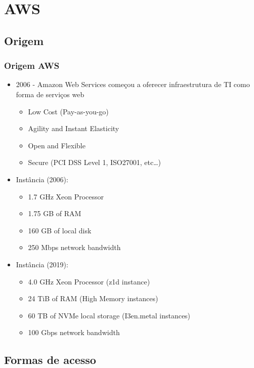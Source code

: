 \section{AWS}

\subsection{Origem}

\begin{frame}[allowframebreaks]
	\frametitle{Origem AWS}
	\begin{itemize}
		\item 2006 - Amazon Web Services começou a oferecer infraestrutura de TI como forma de serviços web
			\begin{itemize}
				\item Low Cost (Pay-as-you-go)
				\item Agility and Instant Elasticity
				\item Open and Flexible
				\item Secure (PCI DSS Level 1, ISO27001, etc\dots)
			\end{itemize}
		\item Instância (2006):
			\begin{itemize}
				\item 1.7 GHz Xeon Processor
				\item 1.75 GB of RAM
				\item 160 GB of local disk
				\item 250 Mbps network bandwidth
			\end{itemize}
		\item Instância (2019):
			\begin{itemize}
				\item 4.0 GHz Xeon Processor (z1d instance)
				\item 24 TiB of RAM (High Memory instances)
				\item 60 TB of NVMe local storage (I3en.metal instances)
				\item 100 Gbps network bandwidth
			\end{itemize}
	\end{itemize}
\end{frame}

\subsection{Formas de acesso}


